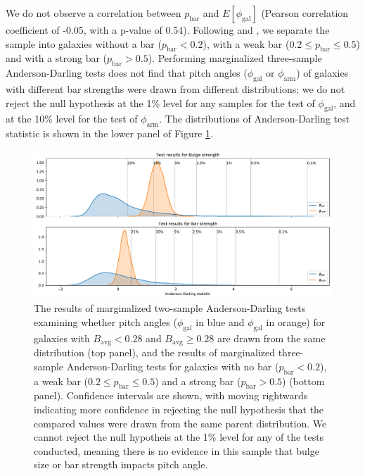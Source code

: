 We do not observe a correlation between $p_\mathrm{bar}$ and $E[\phi_\mathrm{gal}]$ (Pearson correlation coefficient of -0.05, with a p-value of 0.54). Following \citet{2012MNRAS.424.2180M} and \citet{2012MNRAS.423.1485S}, we separate the sample into galaxies without a bar ($p_\mathrm{bar} < 0.2$), with a weak bar ($0.2 \le p_\mathrm{bar} \le 0.5$) and with a strong bar ($p_\mathrm{bar} > 0.5$). Performing marginalized three-sample Anderson-Darling tests does not find that pitch angles ($\phi_\mathrm{gal}$ or $\phi_\mathrm{arm}$) of galaxies with different bar strengths were drawn from different distributions; we do not reject the null hypothesis at the 1\% level for any samples for the test of $\phi_\mathrm{gal}$, and at the 10\% level for the test of $\phi_\mathrm{arm}$. The distributions of Anderson-Darling test statistic is shown in the lower panel of Figure \ref{fig:ad-morphology-test}.

\begin{figure}
  \includegraphics[width=17.7cm]{plots/bulge_bar_test_results.pdf}
  \caption{The results of marginalized two-sample Anderson-Darling tests examining whether pitch angles ($\phi_\mathrm{gal}$ in blue and $\phi_\mathrm{gal}$ in orange) for galaxies with $B_\mathrm{avg} < 0.28$ and $B_\mathrm{avg} \ge 0.28$ are drawn from the same distribution (top panel), and the results of marginalized three-sample Anderson-Darling tests for galaxies with no bar ($p_\mathrm{bar} < 0.2$), a weak bar ($0.2 \le p_\mathrm{bar} \le 0.5$) and a strong bar ($p_\mathrm{bar} > 0.5$) (bottom panel). Confidence intervals are shown, with moving rightwards indicating more confidence in rejecting the null hypothesis that the compared values were drawn from the same parent distribution. We cannot reject the null hypotheis at the 1\% level for any of the tests conducted, meaning there is no evidence in this sample that bulge size or bar strength impacts pitch angle.}
  \label{fig:ad-morphology-test}
\end{figure}

